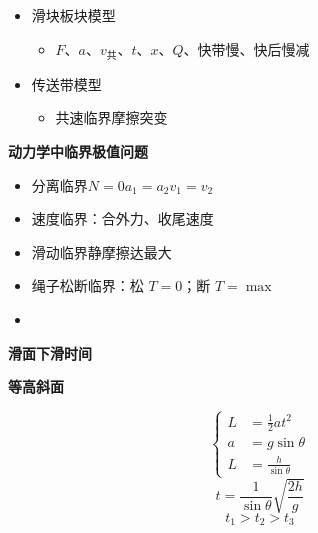 \begin{itemize}
\item 滑块板块模型
  \begin{itemize}
  \item $F$、$a$、$v_{\text{共}}$、$t$、$x$、$Q$、快带慢、快后慢减 %
  \end{itemize}
\end{itemize}
\begin{itemize}
\item 传送带模型
  \begin{itemize}
  \item 共速临界\quad 摩擦突变
  \end{itemize}
\end{itemize}
\textbf{动力学中临界极值问题}
\begin{itemize}
\item 分离临界\quad $N=0$\quad $a_1=a_2$\quad $v_1=v_2$
\item 速度临界：合外力、收尾速度 %
\item 滑动临界\quad 静摩擦达最大
\item 绳子松断临界：松 $T=0$；断 $T=\max$
\item {} %
\end{itemize}
\textbf{滑面下滑时间} %

\textbf{等高斜面}


\[
\left\{\begin{aligned}
L&=\tfrac{1}{2}at^{2}\\
a&=g\sin\theta\\
L&=\frac{h}{\sin\theta}
\end{aligned}\right.
\]
\[
t=\frac{1}{\sin\theta}\sqrt{\frac{2h}{g}}
\]
\[
t_1>t_2>t_3
\]

